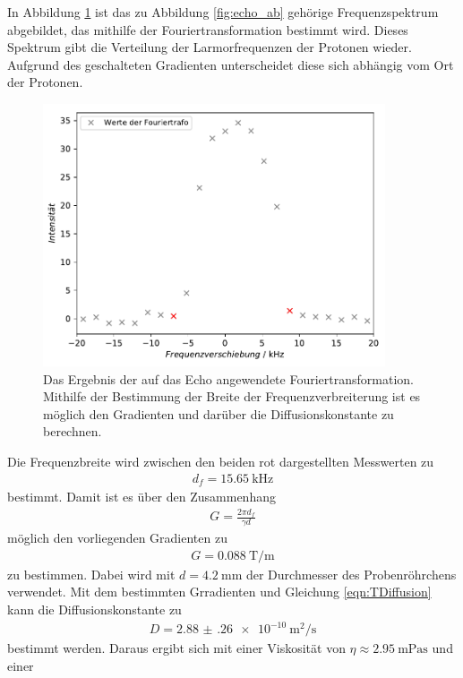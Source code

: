 In Abbildung \ref{fig:ft} ist das zu Abbildung \ref{fig:echo_ab} gehörige Frequenzspektrum abgebildet, das mithilfe der
Fouriertransformation bestimmt wird. Dieses Spektrum gibt die Verteilung der Larmorfrequenzen der Protonen wieder.
Aufgrund des geschalteten Gradienten unterscheidet diese sich abhängig vom Ort der Protonen.
\begin{figure}[H]
  \centering
  \includegraphics[width=0.9\textwidth]{../Auswertung/echo_ft.pdf}
  \caption{Das Ergebnis der auf das Echo angewendete Fouriertransformation. Mithilfe der Bestimmung der Breite der Frequenzverbreiterung
  ist es möglich den Gradienten und darüber die Diffusionskonstante zu berechnen.}
  \label{fig:ft}
\end{figure} \noindent
Die Frequenzbreite wird zwischen den beiden rot dargestellten Messwerten zu
\begin{align*}
  d_f = \SI{15.65}{\kilo\hertz}
\end{align*}
bestimmt.
Damit ist es über den Zusammenhang
\begin{align*}
  G = \frac{2\pi d_f}{\gamma d}
\end{align*}
möglich den vorliegenden Gradienten zu
\begin{align}
  G = \SI{0.088}{\tesla\per\meter}
\end{align}
zu bestimmen. Dabei wird mit $d = \SI{4.2}{\milli\meter}$ der Durchmesser des Probenröhrchens verwendet.
Mit dem bestimmten Grradienten und Gleichung \eqref{eqn:TDiffusion} kann die Diffusionskonstante zu
\begin{align}
  D = \SI{2.88(26)e-10}{\square\meter\per\second}
\end{align}
bestimmt werden.
Daraus ergibt sich mit einer Viskosität von $\eta \approx \SI{2.95}{\milli\pascal\second}$ \cite{viso} und einer
